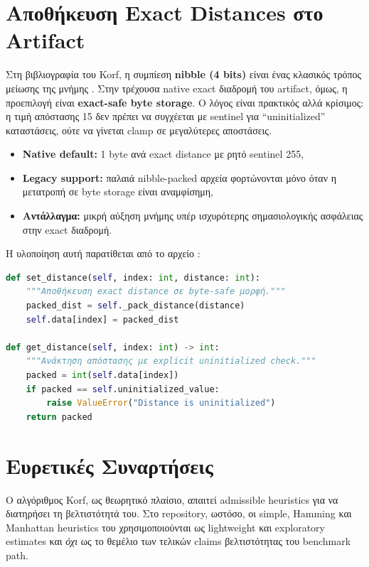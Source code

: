 \section{Αποθήκευση Exact Distances στο Artifact}

Στη βιβλιογραφία του Korf, η συμπίεση \textbf{nibble (4 bits)} είναι ένας
κλασικός τρόπος μείωσης της μνήμης \cite{korf1997finding,felner2007compressed}.
Στην τρέχουσα native exact διαδρομή του artifact, όμως, η προεπιλογή είναι
\textbf{exact-safe byte storage}. Ο λόγος είναι πρακτικός αλλά κρίσιμος: η
τιμή απόστασης 15 δεν πρέπει να συγχέεται με sentinel για
``uninitialized'' καταστάσεις, ούτε να γίνεται clamp σε μεγαλύτερες
αποστάσεις.

\begin{itemize}
    \item \textbf{Native default:} 1 byte ανά exact distance με ρητό sentinel 255,
    \item \textbf{Legacy support:} παλαιά nibble-packed αρχεία φορτώνονται μόνο όταν η μετατροπή σε byte storage είναι αναμφίσημη,
    \item \textbf{Αντάλλαγμα:} μικρή αύξηση μνήμης υπέρ ισχυρότερης σημασιολογικής ασφάλειας στην exact διαδρομή.
\end{itemize}

Η υλοποίηση αυτή παρατίθεται από το αρχείο :

\begin{lstlisting}[language=Python, caption={Exact-safe αποθήκευση αποστάσεων}]
def set_distance(self, index: int, distance: int):
    """Αποθήκευση exact distance σε byte-safe μορφή."""
    packed_dist = self._pack_distance(distance)
    self.data[index] = packed_dist

def get_distance(self, index: int) -> int:
    """Ανάκτηση απόστασης με explicit uninitialized check."""
    packed = int(self.data[index])
    if packed == self.uninitialized_value:
        raise ValueError("Distance is uninitialized")
    return packed
\end{lstlisting}

\section{Ευρετικές Συναρτήσεις}

Ο αλγόριθμος Korf, ως θεωρητικό πλαίσιο, απαιτεί admissible heuristics για να
διατηρήσει τη βελτιστότητά του. Στο repository, ωστόσο, οι simple, Hamming και
Manhattan heuristics του  χρησιμοποιούνται ως
lightweight και exploratory estimates και \emph{όχι} ως το θεμέλιο των τελικών
claims βελτιστότητας του benchmark path.

